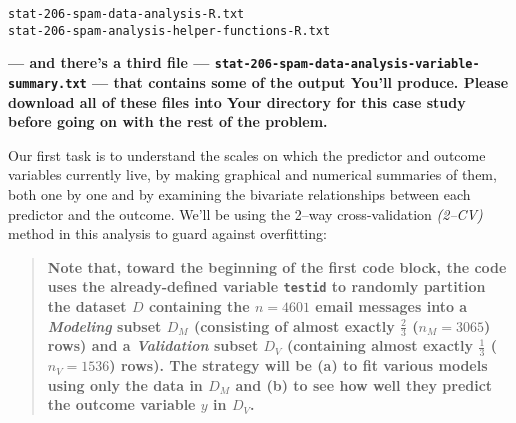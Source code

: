 \documentclass[12pt]{article}
\begin{document}
\hspace*{0.5in} \texttt{stat-206-spam-data-analysis-R.txt}  \\
\hspace*{0.5in} \texttt{stat-206-spam-analysis-helper-functions-R.txt} 

\textbf{--- and there's a third file --- \texttt{stat-206-spam-data-analysis-variable-summary.txt} --- that contains some of the output You'll produce. Please download all of these files into Your directory for this case study before going on with the rest of the problem.}

Our first task is to understand the scales on which the predictor and outcome variables currently live, by making graphical and numerical summaries of them, both one by one and by examining the bivariate relationships between each predictor and the outcome. We'll be using the 2--way cross-validation \textit{(2--CV)} method in this analysis to guard against overfitting:

\begin{quote}

\textbf{Note that, toward the beginning of the first code block, the code uses the already-defined variable \texttt{testid} to randomly partition the dataset $D$ containing the $n = 4601$ email messages into a \textit{Modeling} subset $D_M$ (consisting of almost exactly $\frac{ 2 }{ 3 }$ \vspace*{0.025in} ($n_M = 3065$) rows) and a \textit{Validation} subset $D_V$ (containing almost exactly $\frac{ 1 }{ 3 }$ ($n_V = 1536$) rows). The strategy will be (a) to fit various models using only the data in $D_M$ and (b) to see how well they predict the outcome variable $y$ in $D_V$.}

\end{quote}
\end{document}
